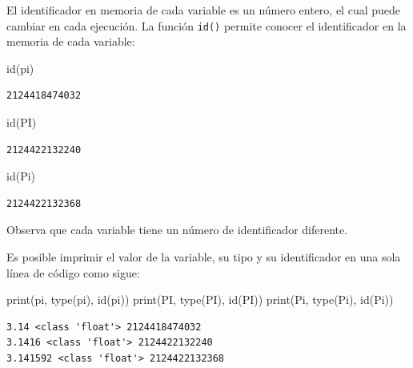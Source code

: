 \documentclass[
  spanish,
  letterpaper,
]{scrbook}
\newenvironment{Shaded}{\begin{snugshade}}{\end{snugshade}}
\newcommand{\BuiltInTok}[1]{\textcolor[rgb]{0.00,0.23,0.31}{#1}}
\newcommand{\NormalTok}[1]{\textcolor[rgb]{0.00,0.23,0.31}{#1}}
\theoremstyle{definition}
\theoremstyle{remark}
\begin{document}
El identificador en memoria de cada variable es un número entero, el
cual puede cambiar en cada ejecución. La función \texttt{id()} permite
conocer el identificador en la memoria de cada variable:

\begin{Shaded}
\begin{Highlighting}[]
\BuiltInTok{id}\NormalTok{(pi)}
\end{Highlighting}
\end{Shaded}

\begin{verbatim}
2124418474032
\end{verbatim}

\begin{Shaded}
\begin{Highlighting}[]
\BuiltInTok{id}\NormalTok{(PI)}
\end{Highlighting}
\end{Shaded}

\begin{verbatim}
2124422132240
\end{verbatim}

\begin{Shaded}
\begin{Highlighting}[]
\BuiltInTok{id}\NormalTok{(Pi)}
\end{Highlighting}
\end{Shaded}

\begin{verbatim}
2124422132368
\end{verbatim}

Observa que cada variable tiene un número de identificador diferente.

Es posible imprimir el valor de la variable, su tipo y su identificador
en una sola línea de código como sigue:

\begin{Shaded}
\begin{Highlighting}[]
\BuiltInTok{print}\NormalTok{(pi, }\BuiltInTok{type}\NormalTok{(pi), }\BuiltInTok{id}\NormalTok{(pi))}
\BuiltInTok{print}\NormalTok{(PI, }\BuiltInTok{type}\NormalTok{(PI), }\BuiltInTok{id}\NormalTok{(PI))}
\BuiltInTok{print}\NormalTok{(Pi, }\BuiltInTok{type}\NormalTok{(Pi), }\BuiltInTok{id}\NormalTok{(Pi))}
\end{Highlighting}
\end{Shaded}

\begin{verbatim}
3.14 <class 'float'> 2124418474032
3.1416 <class 'float'> 2124422132240
3.141592 <class 'float'> 2124422132368
\end{verbatim}
\end{document}
